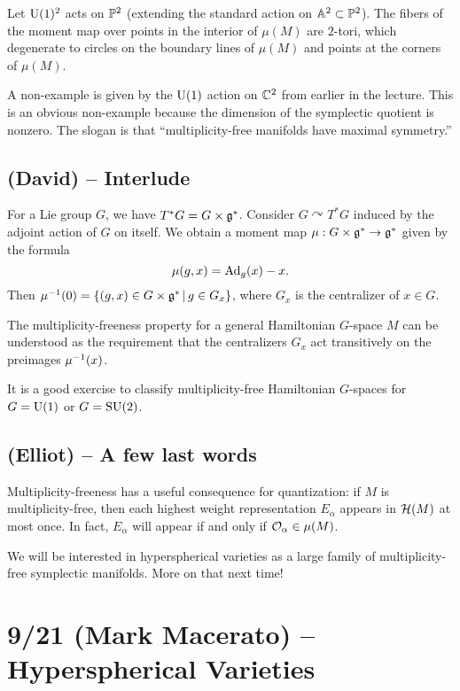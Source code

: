 \documentclass{article}
\begin{document}
\begin{ex}
	Let $\operatorname{U}(1)^2$ acts on $\mathbb{P}^2$ (extending the standard action on $\mathbb{A}^2 \subset \mathbb{P}^2$).
	The fibers of the moment map over points in the interior of $\mu(M)$ are $2$-tori, which degenerate to circles on the boundary lines of $\mu(M)$ and points at the corners of $\mu(M)$.
\end{ex}

A non-example is given by the $\operatorname{U}(1)$ action on $\mathbb{C}^2$ from earlier in the lecture.
This is an obvious non-example because the dimension of the symplectic quotient is nonzero.
The slogan is that ``multiplicity-free manifolds have maximal symmetry.''

\subsection{(David) -- Interlude}

For a Lie group $G$, we have $T^*G = G \times \mathfrak{g}^*$.
Consider $G \curvearrowright T^*G$ induced by the adjoint action of $G$ on itself.
We obtain a moment map $\mu: G \times \mathfrak{g}^* \to \mathfrak{g}^*$ given by the formula
\[
	\mu(g, x) = \operatorname{Ad}_g(x) - x.
\]
Then $\mu^{-1}(0) = \{ (g, x) \in G \times \mathfrak{g}^* \, | \, g \in G_x \}$, where $G_x$ is the centralizer of $x \in G$.

The multiplicity-freeness property for a general Hamiltonian $G$-space $M$ can be understood as the requirement that the centralizers $G_x$ act transitively on the preimages $\mu^{-1}(x)$.

It is a good exercise to classify multiplicity-free Hamiltonian $G$-spaces for $G = \operatorname{U}(1)$ or $G = \operatorname{SU}(2)$.

\subsection{(Elliot) -- A few last words}

Multiplicity-freeness has a useful consequence for quantization: if $M$ is multiplicity-free, then each highest weight representation $E_\alpha$ appears in $\mathcal{H}(M)$ at most once.
In fact, $E_\alpha$ will appear if and only if $\mathcal{O}_\alpha \in \mu(M)$.

We will be interested in hyperspherical varieties as a large family of multiplicity-free symplectic manifolds.
More on that next time!

\section{9/21 (Mark Macerato) -- Hyperspherical Varieties}
\end{document}
